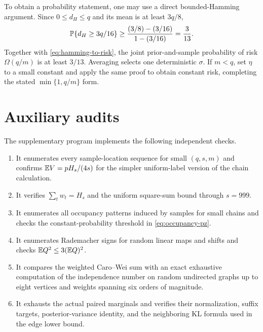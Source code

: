 To obtain a probability statement, one may use a direct bounded-Hamming argument. Since
$0\le d_H\le q$ and its mean is at least $3q/8$,
\[
 \mathbb P\{d_H\ge3q/16\}\ge
 \frac{(3/8)-(3/16)}{1-(3/16)}=\frac3{13}.
\]
Together with \eqref{eq:hamming-to-risk}, the joint prior-and-sample probability of risk
$\Omega(q/m)$ is at least $3/13$. Averaging selects one deterministic $\sigma$. If $m<q$, set
$\eta$ to a small constant and apply the same proof to obtain constant risk, completing the stated
$\min\{1,q/m\}$ form.

\section{Auxiliary audits}

The supplementary program implements the following independent checks.
\begin{enumerate}[leftmargin=*,itemsep=2pt]
\item It enumerates every sample-location sequence for small $(q,s,m)$ and confirms
$\mathbb E V=pH_s/(4s)$ for the simpler uniform-label version of the chain calculation.
\item It verifies $\sum_tw_t=H_s$ and the uniform square-sum bound through $s=999$.
\item It enumerates all occupancy patterns induced by samples for small chains and checks the
constant-probability threshold in \eqref{eq:occupancy-pz}.
\item It enumerates Rademacher signs for random linear maps and shifts and checks
$\mathbb E Q^2\le3(\mathbb E Q)^2$.
\item It compares the weighted Caro--Wei sum with an exact exhaustive computation of the
independence number on random undirected graphs up to eight vertices and weights spanning six
orders of magnitude.
\item It exhausts the actual paired marginals and verifies their normalization, suffix targets,
posterior-variance identity, and the neighboring KL formula used in the edge lower bound.
\end{enumerate}
